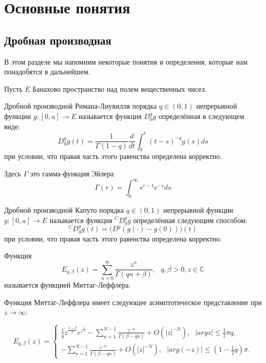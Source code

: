 \section{Основные понятия}

\subsection{Дробная производная}

В этом разделе мы напомним некоторые понятия и определения, которые нам понадобятся в дальнейшем.

Пусть $E$ Банахово пространство над полем вещественных чисел.

\begin{definition}
    Дробной производной Римана-Лиувилля порядка $q \in (0, 1)$ непрерывной функции $g:[0, a] \rightarrow E$ называется
    функция $D_{0}^{q}g$ определённая в следующем виде:
    $$D_{0}^{q}g(t) = \frac{1}{\Gamma(1 - q)}\frac{d}{dt}\int_{0}^{t}(t - s)^{-q}g(s)ds$$
    при условии, что правая часть этого равенства определена корректно.
\end{definition}

Здесь $\Gamma$ это гамма-функция Эйлера $$\Gamma(r) = \int_{0}^{\infty}s^{r-1}e^{-s}ds$$

\begin{definition}
    Дробной производной Капуто порядка $q \in (0, 1)$ непрерывной функции $g:[0, a] \rightarrow E$ называется функция
    ${}^CD_{0}^{q}g$ определённая следующим способом:
    $${}^CD_{0}^{q}g(t) = \Big(D^q(g(\cdot) - g(0))\Big)(t)$$
    при условии, что правая часть этого равенства определена корректно.
\end{definition}

\begin{definition}
    Функция
    $$E_{q,\beta}(z) = \sum_{n=0}^{\infty}\frac{z^n}{\Gamma(qn + \beta)}, \ \ \ q, \beta > 0, z \in \mathbb{C}$$
    называется функцией Миттаг-Леффлера.
\end{definition}

Функция Миттаг-Леффлера имеет следующее асимптотическое представление при $z \rightarrow \infty$:

\begin{equation}
    E_{q,\beta}(z) = 
    \begin{cases}
        \frac{1}{q}z^{\frac{1-\beta}{q}}e^{z^{\frac{1}{q}}} - \sum_{n=1}^{N-1}\frac{z^{-n}}{\Gamma(\beta-qn)} +
        O(|z|^{-N}), \ \ \ |argz| \leq \frac{1}{2} \pi q,\\
        - \sum_{n=1}^{N-1} \frac{z^{-n}}{\Gamma(\beta-qn)} + O(|z|^{-N}), \ \ \ |arg(-z)| \leq (1 - \frac{1}{2}q)\pi.
    \end{cases}
\end{equation}

